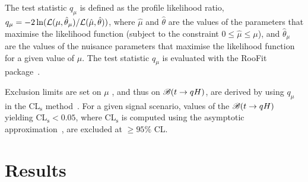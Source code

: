 \documentclass[PAPER, coverpage, atlasdraft=true, texlive=2016, UKenglish]{\ATLASLATEXPATH atlasdoc}
\begin{document}
The test statistic $q_\mu$ is defined as the profile likelihood ratio, 
$q_\mu = -2\ln({\cal L}(\mu,{\hat{\theta}}_\mu)/{\cal L}(\hat{\mu},\hat{\theta}))$,
where $\hat{\mu}$ and $\hat{\theta}$ are the values of the parameters that
maximise the likelihood function (subject to the constraint $0\leq \hat{\mu} \leq \mu$), and ${\hat{\theta}}_\mu$ are the values of the
nuisance parameters that maximise the likelihood function for a given value of $\mu$. 
The test statistic $q_\mu$ is evaluated with the {\textsc RooFit} package~\cite{Verkerke:2003ir,RooFitManual}.

Exclusion limits are set on $\mu$ , and thus on
$\mathscr{B}(t\to qH)$, are derived by using $q_\mu$ in the CL$_{\textrm{s}}$ method~\cite{Junk:1999kv,Read:2002hq}.
For a given signal scenario, values of the $\mathscr{B}(t\to qH)$ yielding CL$_{\textrm{s}} < 0.05$,
where CL$_{\textrm{s}}$ is computed using the asymptotic approximation~\cite{Cowan:2010js}, are excluded at $\geq 95\%$ CL.


\section{Results}
\label{sec:result}
\end{document}
